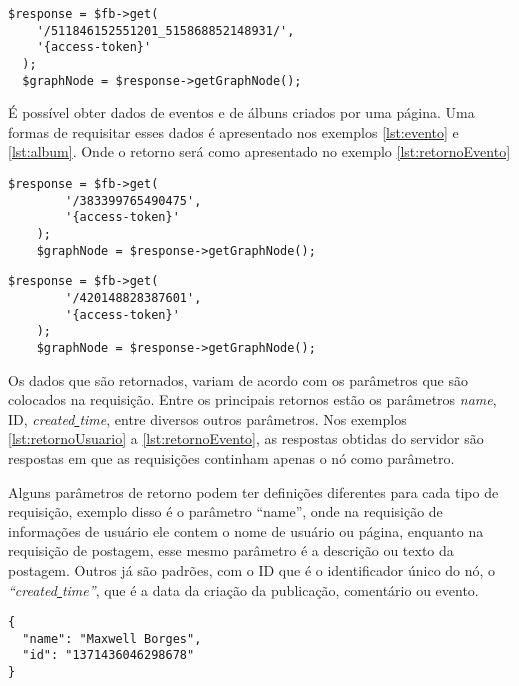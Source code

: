 \begin{lstlisting}[caption={Requisitar informações de um comentário específico},label={lst:comentario}]
  $response = $fb->get(
    '/511846152551201_515868852148931/',
    '{access-token}'
  );
  $graphNode = $response->getGraphNode();
\end{lstlisting}

É possível obter dados de eventos e de álbuns criados por uma página. Uma formas de requisitar esses dados é apresentado nos exemplos \ref{lst:evento} e \ref{lst:album}. Onde o retorno será como apresentado no exemplo \ref{lst:retornoEvento}

\begin{lstlisting}[caption={Requisitar uma evento específico},label={lst:evento}]
	$response = $fb->get(
    	'/383399765490475',
    	'{access-token}'
	);
	$graphNode = $response->getGraphNode();
\end{lstlisting}

\begin{lstlisting}[caption={Requisitar uma álbum específico},label={lst:album}]
	$response = $fb->get(
		'/420148828387601',
		'{access-token}'
	);
	$graphNode = $response->getGraphNode();
\end{lstlisting}

Os dados que são retornados, variam de acordo com os parâmetros que são colocados na requisição. Entre os principais retornos estão os parâmetros \textit{name}, ID, \textit{created\underline{{ }}time}, entre diversos outros parâmetros. Nos exemplos \ref{lst:retornoUsuario} a \ref{lst:retornoEvento}, as respostas obtidas do servidor são respostas em que as requisições continham apenas o nó como parâmetro.  

Alguns parâmetros de retorno podem ter definições diferentes para cada tipo de requisição, exemplo disso é o parâmetro ``name'', onde na requisição de informações de usuário ele contem o nome de usuário ou página, enquanto na requisição de postagem, esse mesmo parâmetro é a descrição ou texto da postagem. Outros já são padrões, com o ID que é o identificador único do nó, o \textit{``created\underline{{ }}time''}, que é a data da criação da publicação, comentário ou evento.

\begin{lstlisting}[caption={Resposta do servidor as requisições \ref{lst:usuario}, \ref{lst:me} e \ref{lst:pagina} (Usuário e Página)},label={lst:retornoUsuario}]
{
  "name": "Maxwell Borges",
  "id": "1371436046298678"
}
\end{lstlisting}

